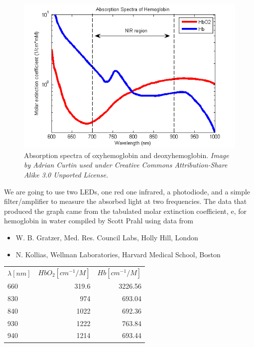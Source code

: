  \begin{figure}
 \caption{Absorption spectra of oxyhemoglobin and deoxyhemoglobin. \emph{Image by Adrian Curtin used under  Creative Commons Attribution-Share Alike 3.0 Unported License.}}
 \label{fig-spectrum}
 \includegraphics{../images/Oxy_and_Deoxy_Hemoglobin_Near-Infrared_absorption_spectra.png}
 \end{figure}

We are going to use two LEDs, one red one infrared, a photodiode, and a simple filter/amplifier to measure the absorbed light at two frequencies.  The data that produced the graph came from the tabulated molar extinction coefficient, e, for hemoglobin in water compiled by Scott Prahl using data from
\begin{itemize}
\item W. B. Gratzer, Med. Res. Council Labs, Holly Hill, London
\item N. Kollias, Wellman Laboratories, Harvard Medical School, Boston
\end{itemize}

\begin{tabular}{lrr}
$\lambda[ nm]$  & $HbO_2[ cm^{-1}/M]$ & $Hb[ cm^{-1}/M]$ \\
660              & 319.6                  & 3226.56 \\
830              & 974                    & 693.04 \\
840              & 1022                   & 692.36 \\
930              & 1222                   & 763.84 \\
940              & 1214                   & 693.44 \\
\end{tabular}

